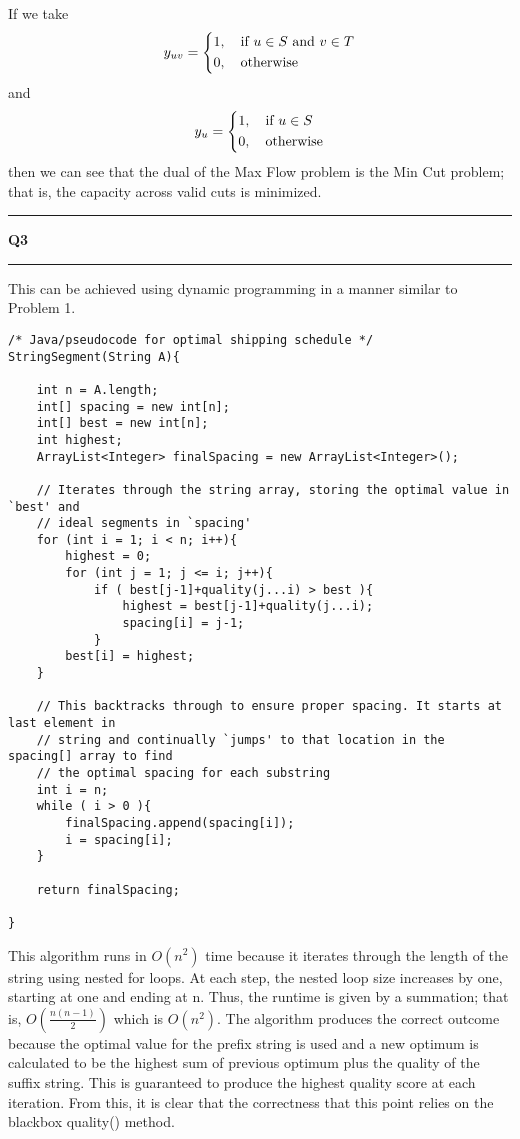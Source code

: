 \documentclass[11pt]{article}
\newcommand\question[2]{\vspace{.25in}\hrule\textbf{#1 #2}\vspace{.5em}\hrule\vspace{.10in}}
\begin{document}
If we take
\begin{align}
y_{uv} = 
\begin{dcases}
    1, \quad \text{if } u \in S \text{ and } v \in T \\
    0, \quad \text{otherwise}
\end{dcases} 
\end{align}
and
\begin{align}
y_{u} = 
\begin{dcases}
    1, \quad \text{if } u \in S \\
    0, \quad \text{otherwise}
\end{dcases} 
\end{align}
then we can see that the dual of the Max Flow problem is the Min Cut problem; that is, the capacity across valid cuts is minimized. 

\newpage
\question{Q3}{}
This can be achieved using dynamic programming in a manner similar to Problem 1.
\begin{lstlisting}
/* Java/pseudocode for optimal shipping schedule */
StringSegment(String A){
	
	int n = A.length;
	int[] spacing = new int[n];
	int[] best = new int[n];
	int highest;
	ArrayList<Integer> finalSpacing = new ArrayList<Integer>();
	
	// Iterates through the string array, storing the optimal value in `best' and 
	// ideal segments in `spacing'
	for (int i = 1; i < n; i++){
		highest = 0;
		for (int j = 1; j <= i; j++){
			if ( best[j-1]+quality(j...i) > best ){
				highest = best[j-1]+quality(j...i);
				spacing[i] = j-1;
			}
		best[i] = highest;
	}
			
	// This backtracks through to ensure proper spacing. It starts at last element in 
	// string and continually `jumps' to that location in the spacing[] array to find 
	// the optimal spacing for each substring
	int i = n;
	while ( i > 0 ){
		finalSpacing.append(spacing[i]);
		i = spacing[i];
	}
		
	return finalSpacing;

}
\end{lstlisting}

This algorithm runs in $O(n^2)$ time because it iterates through the length of the string using nested for loops. At each step, the nested loop size increases by one, starting at one and ending at n. Thus, the runtime is given by a summation; that is, $O(\frac{n(n-1)}{2})$ which is $O(n^2)$. The algorithm produces the correct outcome because the optimal value for the prefix string is used and a new optimum is calculated to be the highest sum of previous optimum plus the quality of the suffix string. This is guaranteed to produce the highest quality score at each iteration. From this, it is clear that the correctness that this point relies on the blackbox quality() method.
\end{document}
